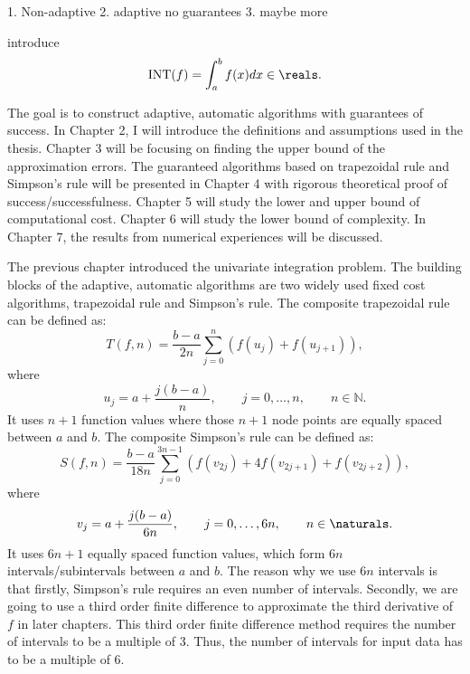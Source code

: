\documentclass{iitthesis}
\theoremstyle{definition}
\theoremstyle{remark}
\begin{document}
1. Non-adaptive
2. adaptive no guarantees
3. maybe more

introduce
\begin{equation}\label{integral}
    \text{INT}(f)=\int_{a}^{b}f(x)dx\in\reals.
\end{equation}

The goal is to construct adaptive, automatic algorithms with guarantees of success. In Chapter 2, I will introduce the definitions and assumptions used in the thesis. Chapter 3 will be focusing on finding the upper bound of the approximation errors. The guaranteed algorithms based on trapezoidal rule and Simpson's rule will be presented in Chapter 4 with rigorous theoretical proof of success/successfulness. Chapter 5 will study the lower and upper bound of computational cost. Chapter 6 will study the lower bound of complexity. In Chapter 7, the results from numerical experiences will be discussed.

\clearpage





The previous chapter introduced the univariate integration problem. The building blocks of the adaptive, automatic algorithms are two widely used fixed cost algorithms, trapezoidal rule and Simpson's rule.
The composite trapezoidal rule can be defined as:
\begin{equation}\label{traprule}
  T(f,n)=\frac{b-a}{2n}\sum_{j=0}^{n}(f(u_{j})+f(u_{j+1})),
\end{equation}
where
\begin{equation}\label{upts}
u_j=a+\frac{j(b-a)}{n}, \qquad j=0, \ldots, n, \qquad n\in\mathbb{N}.
\end{equation}
It uses $n+1$ function values where those $n+1$ node points are equally spaced between $a$ and $b$. The composite Simpson's rule can be defined as:
\begin{equation}\label{simrule}
  S(f,n)=\frac{b-a}{18n}\sum_{j=0}^{3n-1}(f(v_{2j})+4f(v_{2j+1})+f(v_{2j+2})),
\end{equation}
where
\begin{equation}\label{vpts}
v_j=a+\frac{j(b-a)}{6n}, \qquad j=0, \ldots, 6n, \qquad n\in \naturals.
\end{equation}
It uses $6n+1$ equally spaced function values, which form $6n$ intervals/subintervals between $a$ and $b$. The reason why we use $6n$ intervals is that firstly, Simpson's rule requires an even number of intervals. Secondly, we are going to use a third order finite difference to approximate the third derivative of $f$ in later chapters. This third order finite difference method requires the number of intervals to be a multiple of 3. Thus, the number of intervals for input data has to be a multiple of 6.
\end{document}
